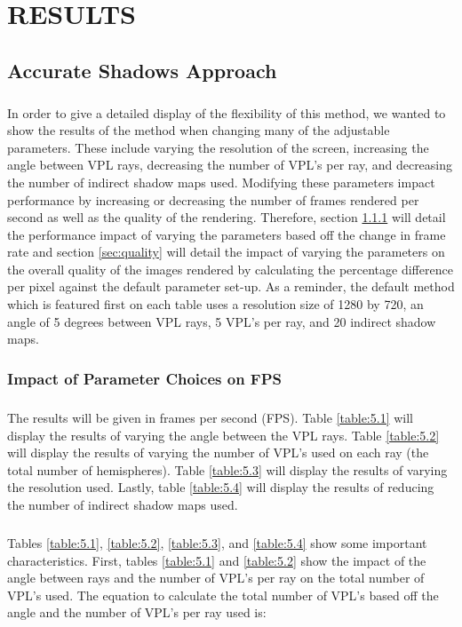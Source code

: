 \chapter{RESULTS}

\section{Accurate Shadows Approach}
\paragraph{}
In order to give a detailed display of the flexibility of this method, we wanted to show the results of the method when changing many of the adjustable parameters.  These include varying the resolution of the screen, increasing the angle between VPL rays, decreasing the number of VPL's per ray, and decreasing the number of indirect shadow maps used. Modifying these parameters impact performance by increasing or decreasing the number of frames rendered per second as well as the quality of the rendering.  Therefore, section \ref{sec:fps} will detail the performance impact of varying the parameters based off the change in frame rate and section \ref{sec:quality} will detail the impact of varying the parameters on the overall quality of the images rendered by calculating the percentage difference per pixel against the default parameter set-up.  As a reminder, the default method which is featured first on each table uses a resolution size of 1280 by 720, an angle of 5 degrees between VPL rays, 5 VPL's per ray, and 20 indirect shadow maps.

\subsection{Impact of Parameter Choices on FPS} \label{sec:fps}
\paragraph{}
The results will be given in frames per second (FPS).  Table \ref{table:5.1} will display the results of varying the angle between the VPL rays. Table \ref{table:5.2} will display the results of varying the number of VPL's used on each ray (the total number of hemispheres). Table \ref{table:5.3} will display the results of varying the resolution used.  Lastly, table \ref{table:5.4} will display the results of reducing the number of indirect shadow maps used.

\paragraph{}
Tables \ref{table:5.1}, \ref{table:5.2}, \ref{table:5.3}, and \ref{table:5.4} show some important characteristics.  First, tables \ref{table:5.1} and \ref{table:5.2} show the impact of the angle between rays and the number of VPL's per ray on the total number of VPL's used.  The equation to calculate the total number of VPL's based off the angle and the number of VPL's per ray used is:


